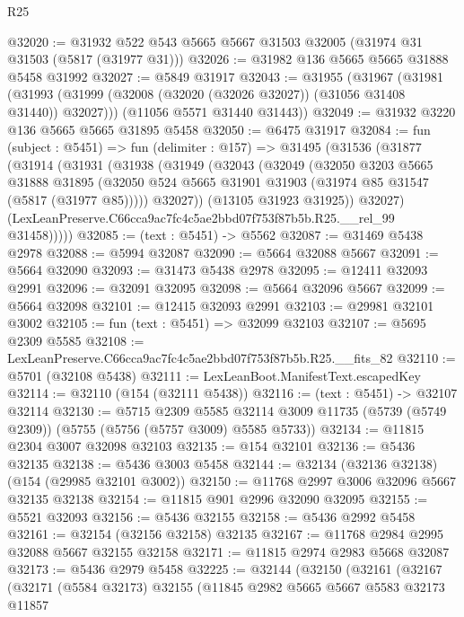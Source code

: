\begin{lexlean}{R25}
\begin{coremodule}
@32020 := @31932 @522 @543 @5665 @5667 @31503 @32005 (@31974 @31 @31503 (@5817 (@31977 @31)))
@32026 := @31982 @136 @5665 @5665 @31888 @5458 @31992
@32027 := @5849 @31917
@32043 := @31955
    (@31967
      (@31981 (@31993 (@31999 (@32008 (@32020 (@32026 @32027)) (@31056 @31408 @31440)) @32027)))
      (@11056 @5571 @31440 @31443))
@32049 := @31932 @3220 @136 @5665 @5665 @31895 @5458
@32050 := @6475 @31917
@32084 := fun (subject : @5451) =>
  fun (delimiter : @157) =>
  @31495
    (@31536
      (@31877
        (@31914
          (@31931
            (@31938
              (@31949
                (@32043
                  (@32049
                    (@32050
                      @3203
                      @5665
                      @31888
                      @31895
                      (@32050 @524 @5665 @31901 @31903 (@31974 @85 @31547 (@5817 (@31977 @85)))))
                    @32027))
                (@13105 @31923 @31925))
              @32027)
            (LexLeanPreserve.C66cca9ac7fc4c5ae2bbd07f753f87b5b.R25.__rel_99 @31458)))))
@32085 := (text : @5451) -> @5562
@32087 := @31469 @5438 @2978
@32088 := @5994 @32087
@32090 := @5664 @32088 @5667
@32091 := @5664 @32090
@32093 := @31473 @5438 @2978
@32095 := @12411 @32093 @2991
@32096 := @32091 @32095
@32098 := @5664 @32096 @5667
@32099 := @5664 @32098
@32101 := @12415 @32093 @2991
@32103 := @29981 @32101 @3002
@32105 := fun (text : @5451) => @32099 @32103
@32107 := @5695 @2309 @5585
@32108 := LexLeanPreserve.C66cca9ac7fc4c5ae2bbd07f753f87b5b.R25.__fits_82
@32110 := @5701 (@32108 @5438)
@32111 := LexLeanBoot.ManifestText.escapedKey
@32114 := @32110 (@154 (@32111 @5438))
@32116 := (text : @5451) -> @32107 @32114
@32130 := @5715
    @2309
    @5585
    @32114
    @3009
    @11735
    (@5739 (@5749 @2309))
    (@5755 (@5756 (@5757 @3009) @5585 @5733))
@32134 := @11815 @2304 @3007 @32098 @32103
@32135 := @154 @32101
@32136 := @5436 @32135
@32138 := @5436 @3003 @5458
@32144 := @32134 (@32136 @32138) (@154 (@29985 @32101 @3002))
@32150 := @11768 @2997 @3006 @32096 @5667 @32135 @32138
@32154 := @11815 @901 @2996 @32090 @32095
@32155 := @5521 @32093
@32156 := @5436 @32155
@32158 := @5436 @2992 @5458
@32161 := @32154 (@32156 @32158) @32135
@32167 := @11768 @2984 @2995 @32088 @5667 @32155 @32158
@32171 := @11815 @2974 @2983 @5668 @32087
@32173 := @5436 @2979 @5458
@32225 := @32144
    (@32150
      (@32161
        (@32167
          (@32171
            (@5584 @32173)
            @32155
            (@11845
              @2982
              @5665
              @5667
              @5583
              @32173
              @11857

\end{coremodule}
\end{lexlean}
